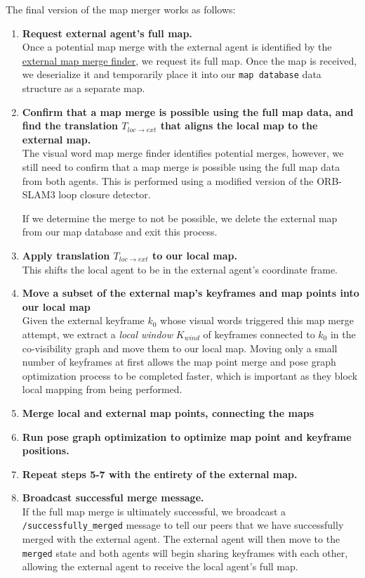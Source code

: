 The final version of the map merger works as follows:

\begin{enumerate}
    \item \textbf{Request external agent's full map.} \\
          Once a potential map merge with the external agent is identified by the \hyperref[sec:external-map-merge-finder]{external map merge finder}, we request its full map. Once the map is received, we deserialize it and temporarily place it into our \texttt{map database} data structure as a separate map.
    \item \textbf{Confirm that a map merge is possible using the full map data, and find the translation $T_{loc \rightarrow ext}$ that aligns the local map to the external map.} \\
          The visual word map merge finder identifies potential merges, however, we still need to confirm that a map merge is possible using the full map data from both agents. This is performed using a modified version of the ORB-SLAM3 loop closure detector.

          If we determine the merge to not be possible, we delete the external map from our map database and exit this process.
    \item \textbf{Apply translation $T_{loc \rightarrow ext}$ to our local map.} \\
          This shifts the local agent to be in the external agent's coordinate frame.
    \item \textbf{Move a subset of the external map's keyframes and map points into our local map} \\
          Given the external keyframe $k_0$ whose visual words triggered this map merge attempt, we extract a \textit{local window} $K_{wind}$ of keyframes connected to $k_0$ in the co-visibility graph and move them to our local map. Moving only a small number of keyframes at first allows the map point merge and pose graph optimization process to be completed faster, which is important as they block local mapping from being performed.
    \item \textbf{Merge local and external map points, connecting the maps}
    \item \textbf{Run pose graph optimization to optimize map point and keyframe positions.}
    \item \textbf{Repeat steps 5-7 with the entirety of the external map.}
    \item \textbf{Broadcast successful merge message.} \\
          If the full map merge is ultimately successful, we broadcast a \texttt{/successfully\_merged} message to tell our peers that we have successfully merged with the external agent. The external agent will then move to the \texttt{merged} state and both agents will begin sharing keyframes with each other, allowing the external agent to receive the local agent's full map.

\end{enumerate}

